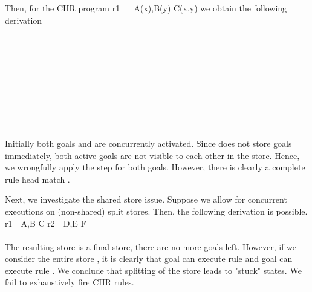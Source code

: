 \documentclass{tlp}
\begin{document}
Then, for the CHR program
 r1 ~\atsign~ A(x),B(y) \simparrow C(x,y) 
\eda
we obtain the following derivation
{\small
{}
   \myirule
   {
     \\ \\
     \sgap {} \partrans {} \\
    \mid\mid \\
     \sgap {} \partrans {}
    \ea}
   { \partrans {}} \\ \\
   \myirule
   {
     \sgap {} \partrans {} \\
    \mid\mid \\
     \sgap {} \partrans {} 
    \ea}
   { \partrans 
    }
  
\eda
}


Initially
both goals  and  are concurrently activated. Since  does not store goals
immediately, both active goals are not visible to each other in the store.
Hence, we wrongfully apply the  step for
both goals.
However, there is clearly  a complete rule head match .

Next, we investigate the shared store issue.
Suppose we allow for concurrent executions on (non-shared) split stores.
Then, the following derivation is possible.
{\small
{}
   r1~\atsign~A,B \simparrow C \bgap r2~\atsign~D,E \simparrow F \\ \\
           { \partrans
            }
\eda
}
The resulting store is a final store, there are 
no more goals left. However, if we consider the entire store , it is clearly
that goal  can execute rule  and goal  can execute rule .
We conclude that splitting of the store leads to "stuck" states. We fail
to exhaustively fire CHR rules.
\end{document}
